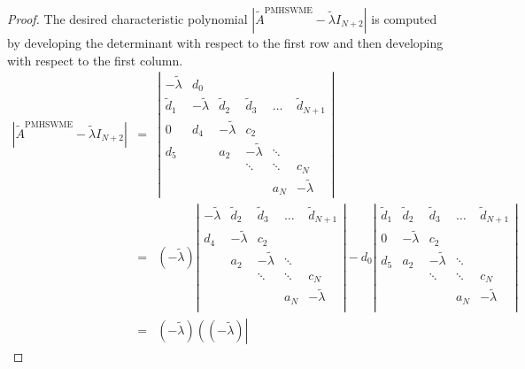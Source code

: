 \documentclass[10pt,a4paper]{amsart}
\begin{document}
\begin{proof}
    The desired characteristic polynomial $\left| \widetilde{A}^{{\textrm{PMHSWME}}} - \widetilde{\lambda} I_{N+2} \right|$ is computed by developing the determinant with respect to the first row and then developing with respect to the first column.
    \begin{eqnarray*}
        \left| \widetilde{A}^{{\textrm{PMHSWME}}} - \widetilde{\lambda} I_{N+2} \right| &=& \left|
        \begin{array}{cccccc}
    - \widetilde{\lambda} & d_0 &  &  &  &  \\
    \widetilde{d}_{1} & - \widetilde{\lambda} & \widetilde{d}_{2} & \widetilde{d}_{3} & \dots & \widetilde{d}_{{N+1}} \\
    0 & d_4 & - \widetilde{\lambda} & c_2 & &\\
    d_5 &   & a_2 & - \widetilde{\lambda} & \ddots & \\
     &  &  & \ddots & \ddots & c_N \\
     &  &  &  & a_N & - \widetilde{\lambda}
    \end{array}
        \right| \\
      &=& (-\widetilde{\lambda})
      \left|
        \begin{array}{ccccc}
         -\widetilde{\lambda} & \widetilde{d}_{2} & \widetilde{d}_{3} & \dots & \widetilde{d}_{{N+1}} \\
          d_4 & -\widetilde{\lambda} & c_2  &  &   \\
           & a_2 & -\widetilde{\lambda} & \ddots  &   \\
        &  & \ddots & \ddots & c_N \\
         &  &  & a_N & -\widetilde{\lambda}   \\
        \end{array}
        \right|
        -d_0 \left|
        \begin{array}{ccccc}
        \widetilde{d}_{1} & \widetilde{d}_{2} & \widetilde{d}_{3} & \dots & \widetilde{d}_{{N+1}} \\
         0 &  -\widetilde{\lambda} & c_2  &  &   \\
         d_5 & a_2 & -\widetilde{\lambda} & \ddots  &   \\
        &   & \ddots & \ddots & c_N \\
         &   &  & a_N & -\widetilde{\lambda}   \\
        \end{array}
        \right| \\
        &=& (-\widetilde{\lambda}) \left( (-\widetilde{\lambda})  \left|

\end{eqnarray*}
\end{proof}
\end{document}
